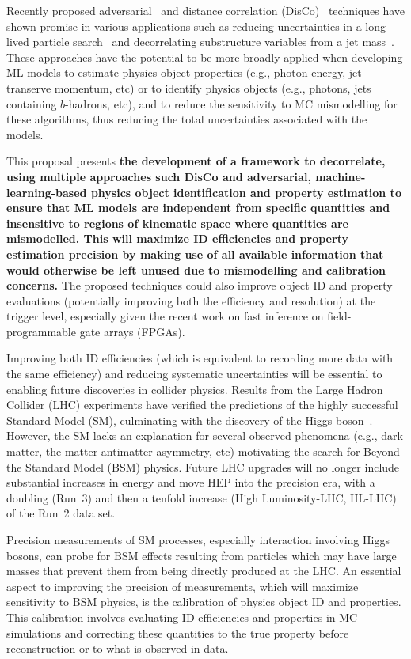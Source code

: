 \documentclass[letter, USenglish, 11pt, subfigure]{article}
\begin{document}
Recently proposed adversarial~\cite{louppe2017learning} and distance correlation (DisCo)~\cite{PhysRevLett.125.122001} techniques have shown promise in various applications such as reducing uncertainties in a long-lived particle search~\cite{calRatio}  and decorrelating substructure variables from a jet mass~\cite{ATL-PHYS-PUB-2018-014}. These approaches have the potential to be more broadly applied when developing ML models to estimate physics object properties (e.g., photon energy, jet transerve momentum, etc) or to identify physics objects (e.g., photons, jets containing $b$-hadrons, etc), and to reduce the sensitivity to MC mismodelling for these algorithms, thus reducing the total uncertainties associated with the models. 

This proposal presents {\bf the development of a framework to decorrelate, using multiple approaches such DisCo and adversarial, machine-learning-based physics object identification and property estimation to ensure that ML models are independent from specific quantities and insensitive to regions of kinematic space where quantities are mismodelled. This will maximize ID efficiencies and property estimation precision by making use of all available information that would otherwise be left unused due to mismodelling and calibration concerns.} The proposed techniques could also improve object ID and property evaluations (potentially improving both the efficiency and resolution) at the trigger level, especially given the recent work on fast inference on field-programmable gate arrays (FPGAs).

Improving both ID efficiencies (which is equivalent to recording more data with the same efficiency) and reducing systematic uncertainties will be essential to enabling future discoveries in collider physics.  Results from the Large Hadron Collider (LHC) experiments have verified the predictions of the highly successful Standard Model (SM), culminating with the discovery of the Higgs boson~\cite{HIGG-2012-27,CMS-HIG-12-028}. However, the SM  lacks an explanation for several observed phenomena (e.g., dark matter, the matter-antimatter asymmetry, etc) motivating the search for Beyond the Standard Model (BSM) physics. Future LHC upgrades will no longer include substantial increases in energy and move HEP into the precision era, with a doubling (Run~3) and then a tenfold increase (High Luminosity-LHC, HL-LHC) of the Run~2 data set. 

Precision measurements of SM processes, especially interaction involving Higgs bosons, can probe for BSM effects resulting from particles which may have large masses that prevent them from being directly produced at the LHC. An essential aspect to improving the precision of measurements, which will maximize sensitivity to BSM physics, is the calibration of physics object ID and properties. This calibration involves evaluating ID efficiencies and properties in MC simulations and correcting these quantities to the true property before reconstruction or to what is observed in data. 
\end{document}
